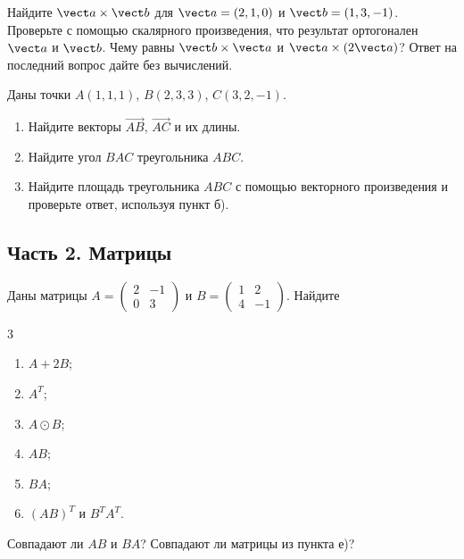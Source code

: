 \begin{exercise}
Найдите $\vect a\times\vect b$ для $\vect a=(2,1,0)$ и $\vect b=(1,3,-1)$. Проверьте с помощью скалярного произведения, что результат ортогонален $\vect a$ и $\vect b$. Чему равны $\vect b\times\vect a$ и $\vect a\times(2\vect a)$? Ответ на последний вопрос дайте без вычислений.
\end{exercise}

\begin{exercise}
Даны точки $A(1,1,1)$, $B(2,3,3)$, $C(3,2,-1)$.
\begin{enumerate}[label=\asbuk*)]
  \item Найдите векторы $\overrightarrow{AB}$, $\overrightarrow{AC}$ и их длины.
  \item Найдите угол $BAC$ треугольника $ABC$.
  \item Найдите площадь треугольника $ABC$ с помощью векторного произведения и проверьте ответ, используя пункт б).
\end{enumerate}
\end{exercise}

\subsection*{Часть 2. Матрицы}

\begin{exercise}
Даны матрицы $A=\begin{pmatrix}2&-1\\0&3\end{pmatrix}$ и $B=\begin{pmatrix}1&2\\4&-1\end{pmatrix}$. Найдите
\begin{multicols}{3}
\begin{enumerate}[label=\asbuk*)]
  \item $A+2B$;
  \item $A^T$;
  \item $A\odot B$;
  \item $AB$;
  \item $BA$;
  \item $(AB)^T$ и $B^TA^T$.
\end{enumerate}
\end{multicols}
Совпадают ли $AB$ и $BA$? Совпадают ли матрицы из пункта е)?
\end{exercise}

